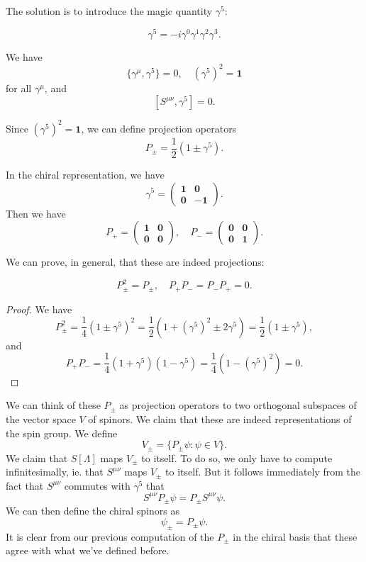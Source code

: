 \documentclass[a4paper]{article}
\begin{document}
The solution is to introduce the magic quantity $\gamma^5$:
\begin{defi}[$\gamma^5$]
  \[
    \gamma^5 = -i \gamma^0 \gamma^1 \gamma^2 \gamma^3.
  \]
\end{defi}

\begin{prop}
  We have
  \[
    \{\gamma^\mu, \gamma^5\} = 0,\quad (\gamma^5)^2 = \mathbf{1}
  \]
  for all $\gamma^\mu$, and
  \[
    [S^{\mu\nu}, \gamma^5] = 0.
  \]
\end{prop}

Since $(\gamma^5)^2 = \mathbf{1}$, we can define projection operators
\[
  P_{\pm} = \frac{1}{2}(1 \pm \gamma^5).
\]
\begin{eg}
  In the chiral representation, we have
  \[
    \gamma^5 =
    \begin{pmatrix}
      \mathbf{1} & \mathbf{0}\\
      \mathbf{0} & -\mathbf{1}
    \end{pmatrix}.
  \]
  Then we have
  \[
    P_+ =
    \begin{pmatrix}
      \mathbf{1} & \mathbf{0}\\
      \mathbf{0} & \mathbf{0}
    \end{pmatrix},
    \quad P_- =
    \begin{pmatrix}
      \mathbf{0} & \mathbf{0}\\
      \mathbf{0} & \mathbf{1}
    \end{pmatrix}.
  \]
\end{eg}
We can prove, in general, that these are indeed projections:
\begin{prop}
  \[
    P_\pm^2 = P_{\pm}, \quad P_+ P_- = P_- P_+ = 0.
  \]
\end{prop}

\begin{proof}
  We have
  \[
    P_{\pm}^2 = \frac{1}{4}(1 \pm \gamma^5)^2 = \frac{1}{2}(1 + (\gamma^5)^2 \pm 2 \gamma^5) = \frac{1}{2}(1 \pm \gamma^5),
  \]
  and
  \[
    P_+P_- = \frac{1}{4}(1 + \gamma^5)(1 - \gamma^5) = \frac{1}{4}(1 - (\gamma^5)^2) = 0.
  \]
\end{proof}
We can think of these $P_{\pm}$ as projection operators to two orthogonal subspaces of the vector space $V$ of spinors. We claim that these are indeed representations of the spin group. We define
\[
  V_{\pm} = \{P_{\pm} \psi: \psi \in V\}.
\]
We claim that $S[\Lambda]$ maps $V_{\pm}$ to itself. To do so, we only have to compute infinitesimally, ie. that $S^{\mu\nu}$ maps $V_{\pm}$ to itself. But it follows immediately from the fact that $S^{\mu\nu}$ commutes with $\gamma^5$ that
\[
  S^{\mu\nu} P_{\pm}\psi = P_{\pm} S^{\mu\nu} \psi.
\]
We can then define the chiral spinors as
\[
  \psi_{\pm} = P_{\pm}\psi.
\]
It is clear from our previous computation of the $P_{\pm}$ in the chiral basis that these agree with what we've defined before.
\end{document}
